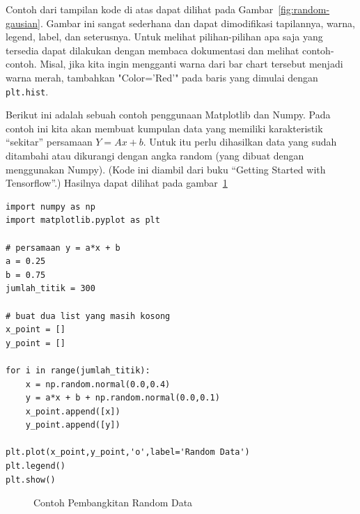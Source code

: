 Contoh dari tampilan kode di atas dapat dilihat pada
Gambar~\ref{fig:random-gausian}.
Gambar ini sangat sederhana dan dapat dimodifikasi tapilannya,
warna, legend, label, dan seterusnya.
Untuk melihat pilihan-pilihan apa saja yang tersedia dapat dilakukan
dengan membaca dokumentasi dan melihat contoh-contoh.
Misal, jika kita ingin mengganti warna dari bar chart tersebut
menjadi warna merah, tambahkan "Color='Red'" pada baris yang 
dimulai dengan {\tt plt.hist}.


Berikut ini adalah sebuah contoh penggunaan Matplotlib dan Numpy. Pada contoh ini kita akan membuat kumpulan data yang memiliki karakteristik ``sekitar'' persamaan 
$Y = Ax + b$.
Untuk itu perlu dihasilkan data yang sudah ditambahi atau dikurangi dengan angka random (yang dibuat dengan menggunakan Numpy). (Kode ini diambil dari buku ``Getting Started with Tensorflow''\cite{tensorflowstarted}.)
Hasilnya dapat dilihat pada gambar~\ref{fig:randomnumpy}


\begin{verbatim}
import numpy as np
import matplotlib.pyplot as plt

# persamaan y = a*x + b
a = 0.25
b = 0.75
jumlah_titik = 300

# buat dua list yang masih kosong
x_point = []
y_point = []

for i in range(jumlah_titik):
    x = np.random.normal(0.0,0.4)
    y = a*x + b + np.random.normal(0.0,0.1)
    x_point.append([x])
    y_point.append([y])

plt.plot(x_point,y_point,'o',label='Random Data')
plt.legend()
plt.show()
\end{verbatim}


\begin{figure}[ht]
\caption{Contoh Pembangkitan Random Data}
\label{fig:randomnumpy}
\end{figure}

